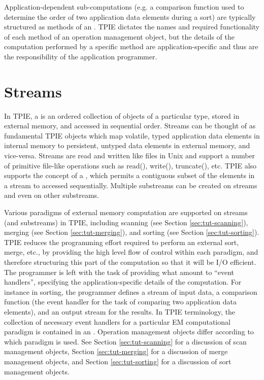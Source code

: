 Application-dependent sub-computations (e.g. a comparison
function used to determine the order of two application data
elements during a sort) are typically structured as methods
of an . TPIE dictates the
names and required functionality of each method of an
operation management object, but the details of the
computation performed by a specific method are
application-specific and thus are the responsibility of the
application programmer. 


\section{Streams}


In TPIE, a  is an ordered collection of objects
of a particular type, stored in external memory, and
accessed in sequential order. Streams can be thought of as
fundamental TPIE objects which map volatile, typed
application data elements in internal
memory to persistent, untyped data elements in external
memory, and vice-versa.  Streams are read and written like
files in Unix and support a number of primitive file-like
operations such as read(), write(), truncate(), etc. 
TPIE also supports the concept of a , which
permits a contiguous subset of the elements in a stream to
accessed sequentially. Multiple substreams can be created on
streams and even on other substreams. 

Various paradigms of external memory computation are
supported on streams (and substreams) in TPIE, including
scanning (see Section \ref{sec:tut-scanning}), merging (see
Section \ref{sec:tut-merging}), and sorting (see Section
\ref{sec:tut-sorting}). TPIE reduces the programming effort
required to perform an external sort, merge, etc., by
providing the high level flow of control within each
paradigm, and therefore structuring this part of the
computation so that it will be I/O efficient. The programmer
is left with the task of providing what amount to ``event
handlers'', specifying the application-specific details of
the computation. For instance in sorting, the programmer
defines a stream of input data, a comparison function (the
event handler for the task of comparing two application data
elements), and an output stream for the results. In TPIE
terminology, the collection of necessary event handlers for
a particular EM computational paradigm is contained in an
. Operation management objects differ
according to which paradigm is used.  See Section
\ref{sec:tut-scanning} for a discussion of scan management
objects, Section \ref{sec:tut-merging} for a discussion of merge
management objects, and Section \ref{sec:tut-sorting} for a
discussion of sort management objects.

